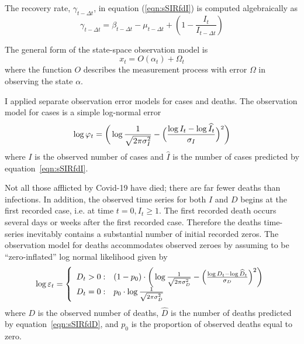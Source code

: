 \documentclass[12pt,letterpaper]{article}
\begin{document}
The recovery rate, $\gamma_{t-\Delta t}$, in equation
(\ref{eqn:sSIRfdI}) is computed algebraically as
\begin{equation}
\gamma_{t-\Delta t} = \beta_{t-\Delta t} - \mu_{t-\Delta t} +
(1-\frac{I_t}{I_{t-\Delta t}})
\end{equation}

The general form of the state-space observation model is
\begin{equation}
x_t = O(\alpha_t) + \Omega_t
\end{equation}
where the function $O$ describes the measurement process with
error $\Omega$ in observing the state $\alpha$.

I applied separate observation error models for cases and
deaths. The observation model for cases is a simple log-normal error
\begin{equation}
\label{eqn:logNlike}
\log\varphi_t = \bigg(\log\frac{1}{\sqrt{2\pi\sigma^2_I}} -\Bigl(\frac{\log
I_t-\log\widehat{I}_t}{\sigma_I}\Bigr)^2\bigg)\\
\end{equation}
where $I$ is the observed number of cases and $\widehat{I}$ is the
number of cases predicted by equation~\ref{eqn:sSIRfdI}.


Not all those afflicted by Covid-19 have died; there are far fewer
deaths than infections. In addition,
the observed time series for both $I$ and $D$ begins at the first recorded
case, i.e. at time $t=0, I_t \ge 1$. The first recorded death occurs
several days or weeks after the first recorded case.
Therefore the deaths time-series inevitably contains a
substantial number of initial recorded zeros. 
The observation model for deaths accommodates observed zeroes by
assuming to be ``zero-inflated'' log normal likelihood given by
\begin{equation}
\label{eqn:ZIlogNlike}
  \log \varepsilon_t = \left\{
    \begin{array}{r@{\;:\quad}l}
       D_t > 0 &
(1-p_0)\cdot\bigg(\log\frac{1}{\sqrt{2\pi\sigma^2_D}}
          -\Bigl(\frac{\log D_t-\log\widehat{D}_t}{\sigma_D}\Bigr)^2\bigg)\\
       D_t = 0 & p_0 \cdot\log \frac{1}{\sqrt{2\pi\sigma^2_D}}\\
    \end{array}
  \right.
\end{equation}
where $D$ is the observed number of deaths,
$\widehat{D}$ is the number of deaths predicted by
equation~\ref{eqn:sSIRfdD}, 
and $p_0$ is the proportion of observed deaths equal to zero.
\end{document}
